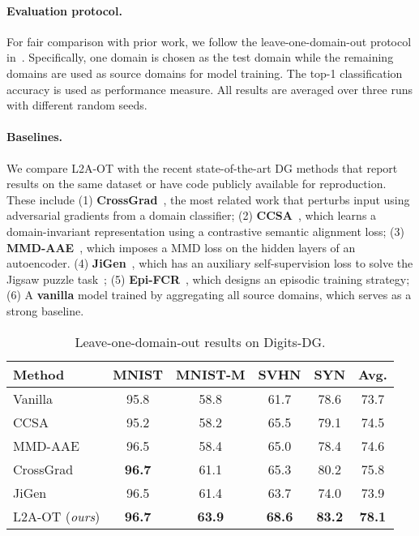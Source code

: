 \documentclass[runningheads]{llncs}
\begin{document}
\paragraph{Evaluation protocol.}
For fair comparison with prior work, we follow the leave-one-domain-out protocol in~\cite{li2017deeper,cvpr19JiGen,li2019episodic}. Specifically, one domain is chosen as the test domain while the remaining domains are used as source domains for model training. The top-1 classification accuracy is used as performance measure. All results are averaged over three runs with different random seeds.

\paragraph{Baselines.}
We compare L2A-OT with the recent state-of-the-art DG methods that report results on the same dataset or have code publicly available for reproduction. These include
(1) \textbf{CrossGrad}~\cite{shankar2018generalizing}, the most related work that perturbs input using adversarial gradients from a domain classifier;
(2) \textbf{CCSA}~\cite{motiian2017unified}, which learns a domain-invariant representation using a contrastive semantic alignment loss;
(3) \textbf{MMD-AAE}~\cite{li2018mmdaae}, which imposes a MMD loss on the hidden layers of an autoencoder.
(4) \textbf{JiGen}~\cite{cvpr19JiGen}, which has an auxiliary self-supervision loss to solve the Jigsaw puzzle task~\cite{jigsaw_puzzles};
(5) \textbf{Epi-FCR}~\cite{li2019episodic}, which designs an episodic training strategy;
(6) A \textbf{vanilla} model trained by aggregating all source domains, which serves as a strong baseline.

\begin{table}[t]
\tabstyle{6pt}
\begin{tabular}{l | c c c c | c}
\hline
Method & MNIST & MNIST-M & SVHN & SYN & Avg. \\ \hline
Vanilla & 95.8 & 58.8 & 61.7 & 78.6 & 73.7 \\
CCSA~\cite{motiian2017unified} & 95.2 & 58.2 & 65.5 & 79.1 & 74.5 \\
MMD-AAE~\cite{li2018mmdaae} & 96.5 & 58.4 & 65.0 & 78.4 & 74.6 \\
CrossGrad~\cite{shankar2018generalizing} & \textbf{96.7} & 61.1 & 65.3 & 80.2 & 75.8 \\
JiGen~\cite{cvpr19JiGen} & 96.5 & 61.4 & 63.7 & 74.0 & 73.9 \\
L2A-OT (\emph{ours}) & \textbf{96.7} & \textbf{63.9} & \textbf{68.6} & \textbf{83.2} & \textbf{78.1} \\
\hline
\end{tabular}
\caption{Leave-one-domain-out results on Digits-DG.}
\label{tab:resOnDigitsDG}
\end{table}
\end{document}
